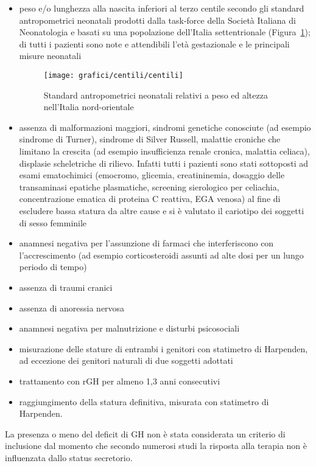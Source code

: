 \begin{itemize}
\item peso e/o lunghezza alla nascita inferiori al terzo centile secondo gli standard antropometrici neonatali prodotti dalla task-force della Società Italiana di Neonatologia e basati su una popolazione dell'Italia settentrionale\cite{standard} (Figura~\ref{fig:StandardNeonataliNordOccidentali}); di tutti i pazienti sono note e attendibili l'età gestazionale e le principali misure neonatali
\begin{figure}[!h]
  \begin{center}
      \texttt{[image: grafici/centili/centili]} %
  \end{center}
  \caption{Standard antropometrici neonatali relativi a peso ed altezza nell'Italia nord-orientale}
  \label{fig:StandardNeonataliNordOccidentali}
\end{figure}
\item assenza di malformazioni maggiori, sindromi genetiche conosciute (ad esempio sindrome di Turner), sindrome di Silver Russell, malattie croniche che limitano la crescita (ad esempio insufficienza renale cronica, malattia celiaca), displasie scheletriche di rilievo. Infatti tutti i pazienti sono stati sottoposti ad esami ematochimici (emocromo, glicemia, creatininemia, dosaggio delle transaminasi epatiche plasmatiche, screening sierologico per celiachia, concentrazione ematica di proteina C reattiva, EGA venosa) al fine di escludere bassa statura da altre cause e si è valutato il cariotipo dei soggetti di sesso femminile
 \item anamnesi negativa per l'assunzione di farmaci che interferiscono con l'accrescimento (ad esempio corticosteroidi assunti ad alte dosi per un lungo periodo di tempo)
 \item assenza di traumi cranici
 \item assenza di anoressia nervosa
 \item anamnesi negativa per malnutrizione e disturbi psicosociali
 \item misurazione delle stature di entrambi i genitori con statimetro di Harpenden, ad eccezione dei genitori naturali di due soggetti adottati
\item trattamento con rGH per almeno 1,3 anni consecutivi
\item raggiungimento della statura definitiva, misurata con statimetro di Harpenden. 
\end{itemize}

La presenza o meno del deficit di GH non è stata considerata un criterio di inclusione dal momento che secondo numerosi studi la risposta alla terapia non è influenzata dallo status secretorio\cite{sas1999growth,van2003adult}.


